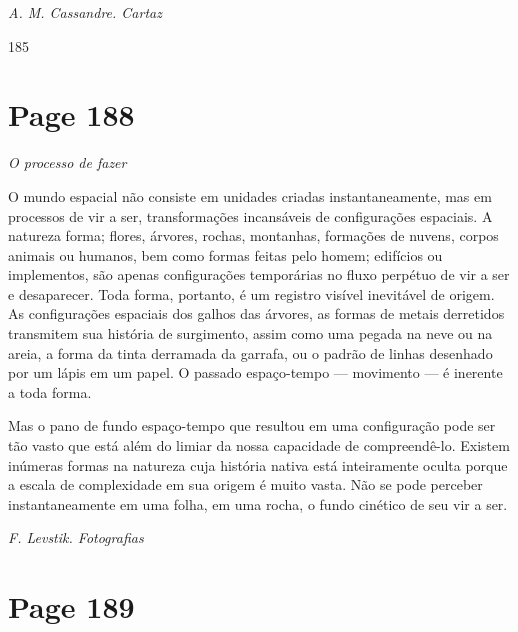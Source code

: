 \documentclass[a4paper]{article}
\begin{document}
\vspace{\baselineskip}
\textit{A. M. Cassandre. Cartaz}

\vfill
185

\newpage
\section*{Page 188}

\begin{center}
\textit{O processo de fazer}
\end{center}

\vspace{1em}

O mundo espacial não consiste em unidades criadas instantaneamente, mas em processos de vir a ser, transformações incansáveis de configurações espaciais. A natureza forma; flores, árvores, rochas, montanhas, formações de nuvens, corpos animais ou humanos, bem como formas feitas pelo homem; edifícios ou implementos, são apenas configurações temporárias no fluxo perpétuo de vir a ser e desaparecer. Toda forma, portanto, é um registro visível inevitável de origem. As configurações espaciais dos galhos das árvores, as formas de metais derretidos transmitem sua história de surgimento, assim como uma pegada na neve ou na areia, a forma da tinta derramada da garrafa, ou o padrão de linhas desenhado por um lápis em um papel. O passado espaço-tempo --- movimento --- é inerente a toda forma.

Mas o pano de fundo espaço-tempo que resultou em uma configuração pode ser tão vasto que está além do limiar da nossa capacidade de compreendê-lo. Existem inúmeras formas na natureza cuja história nativa está inteiramente oculta porque a escala de complexidade em sua origem é muito vasta. Não se pode perceber instantaneamente em uma folha, em uma rocha, o fundo cinético de seu vir a ser.

\vspace*{\fill}

 \hfill \textit{F. Levstik. Fotografias}

\newpage
\section*{Page 189}

\begingroup %
\raggedright %

\noindent %
\end{document}
